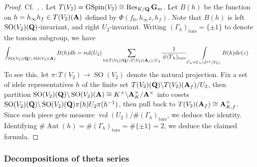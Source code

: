 \documentclass{amsart}
\theoremstyle{definition}
\begin{document}
\begin{proof} Cf.~\cite[Lemma 4.5]{BY}, \cite[Lemma 2.13]{Sch}. Let $T(V_2) = \operatorname{GSpin}(V_2) \cong \operatorname{Res}_{K/{\bf{Q}}}{\bf{G}}_m$. 
Let $B(h)$ be the function on $h = h_{\infty}h_f \in T(V_2)({\bf{A}})$ defined by $\Phi(f_0, h_{\infty}z, h_f)$.
Note that $B(h)$ is left $\operatorname{SO}(V_2)({\bf{Q}})$-invariant, and right $U_2$-invariant.
Writing $(\Gamma_h)_{\operatorname{tors}} = \lbrace \pm 1 \rbrace$ to denote the torsion subgroup, we have  
\begin{align*} \int_{ \operatorname{SO}(V_2)({\bf{Q}}) \backslash \operatorname{SO}(V_2)({\bf{A}})  } B(h) dh 
&= \operatorname{vol}(U_2) \sum\limits_{h \in T(V_2)({\bf{Q}}) \backslash T(V_2)({\bf{A}}_f)/U_2 } \frac{1}{\# (\Gamma_h)_{\operatorname{tors}}}
\int\limits_{C_h = \Gamma_h \backslash D^{\pm}(V_2)} B(h) d \nu(z) \end{align*}
To see this, let $\pi: T(V_2) \rightarrow \operatorname{SO}(V_2)$ denote the natural projection. 
Fix a set of idele representatives $h$ of the finite set $T(V_2)({\bf{Q}}) \backslash T(V_2)({\bf{A}}_f)/U_2$, then partition 
$\operatorname{SO}(V_2)({\bf{Q}}) \backslash \operatorname{SO}(V_2)({\bf{A}}) \cong K^{\times} \backslash {\bf{A}}_K^{\times} / {\bf{A}}^{\times}$ 
into cosets $\operatorname{SO}(V_2)({\bf{Q}}) \backslash \operatorname{SO}(V_2)({\bf{Q}}) \pi(h) U_2 \pi(h^{-1}) $, 
then pull back to $T(V_2)({\bf{A}}_f)  \cong {\bf{A}}_{K,f}^{\times} $. 
Since each piece gets measure $\operatorname{vol}(U_2)/ \#(\Gamma_h)_{\operatorname{tors}}$, we deduce the identity. 
Identifying $\#\operatorname{Aut}(h) = \# (\Gamma_h)_{\operatorname{tors}} = \#\lbrace \pm1 \rbrace = 2$, we deduce the claimed formula. \end{proof}

\subsubsection{Decompositions of theta series}
\end{document}
